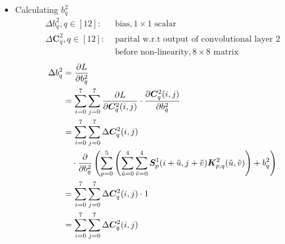 \documentclass[12pt]{article}
\begin{document}
\begin{itemize}
\item Calculating $b^2_q$
\begin{align*}
    \Delta b^2_q, q \in [12]:& \text{ bias}, 1 \times 1 \text{ scalar}\\
    \Delta \bm{C}_{q}^2, q \in [12]:& \text{ parital w.r.t output of convolutional layer 2} \\& \text{ before non-linearity}, 8 \times 8 \text{ matrix}
\end{align*}
\begin{align*}
    \Delta b^2_q
    &= \frac{\partial L}{\partial b^2_q}\\
    &= \sum_{i=0}^{7}\sum_{j=0}^{7}\frac{\partial L}{\partial\bm{C}_{q}^2(i, j)}
    \cdot
    \frac{\partial\bm{C}_{q}^2(i, j)}{\partial b^2_q}\\
    &= \sum_{i=0}^{7}\sum_{j=0}^{7}\Delta \bm{C}_{q}^2(i, j)\\
    &\quad\cdot
    \frac{\partial}{\partial b^2_q}
    \left(\sum_{p = 0}^5\left(\sum_{\Tilde{u} = 0}^4\sum_{\Tilde{v} = 0}^4\bm{S}^1_p(i + \Tilde{u}, j + \Tilde{v})\bm{K}^2_{p, q}(\Tilde{u}, \Tilde{v})\right) + b^2_q\right)\\
    &= \sum_{i=0}^{7}\sum_{j=0}^{7}\Delta \bm{C}_{q}^2(i, j)
    \cdot 1\\
    &= \sum_{i=0}^{7}\sum_{j=0}^{7}\Delta \bm{C}_{q}^2(i, j)
\end{align*}
\end{itemize}
\end{document}
